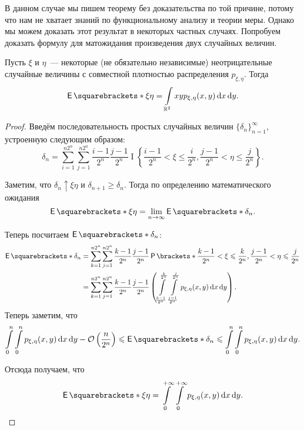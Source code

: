 В данном случае мы пишем теорему без доказательства по той причине, потому что нам не хватает знаний по функциональному анализу и теории меры. Однако мы можем доказать этот результат в некоторых частных случаях. Попробуем доказать формулу для матожидания произведения двух случайных величин.
\begin{theorem}
	Пусть \(\xi\) и \(\eta\)~--- некоторые (не обязательно независимые) неотрицательные случайные величины с совместной плотностью распределения \(p_{\xi, \eta}\). Тогда
	\[
	\E{\xi\eta} = \int\limits_{\R^2} xyp_{\xi,\eta}(x, y)\,\mathrm{d}x\,\mathrm{d}y.
	\]
\end{theorem}
\begin{proof}
	Введём последовательность простых случайных величин \(\{\delta_n\}_{n = 1}^{\infty}\), устроенную следующим образом:
	\[
	\delta_n = \sum_{i = 1}^{n2^{n}}\sum_{j = 1}^{n2^{n}} \frac{i - 1}{2^n}\frac{j - 1}{2^n}\mathop{\mathrm{I}}\left\{\frac{i - 1}{2^n} < \xi \leq \frac{i}{2^n}, \frac{j - 1}{2^n} < \eta \leq \frac{j}{2^n}\right\}.
	\]
	
	Заметим, что \(\delta_n \uparrow \xi\eta\) и \(\delta_{n + 1} \geq \delta_{n}\). Тогда по определению математического ожидания
	\[
	\E{\xi\eta} = \lim\limits_{n \to \infty} \E{\delta_n}.
	\]
	
	Теперь посчитаем \(\E{\delta_n}\):
	\begin{align}
		\E{\delta_n} &= \sum_{k = 1}^{n2^{n}}\sum_{j = 1}^{n2^{n}} \frac{k - 1}{2^n}\frac{j - 1}{2^n}\Pr{\frac{k - 1}{2^n} < \xi \leq \frac{k}{2^n}, \frac{j - 1}{2^n} < \eta \leq \frac{j}{2^n}} \\
		&= \sum_{k = 1}^{n2^{n}}\sum_{j = 1}^{n2^{n}} \frac{k - 1}{2^n}\frac{j - 1}{2^n}\left(\int\limits_{\frac{k - 1}{2^n}}^{\frac{k}{2^n}}\int\limits_{\frac{j - 1}{2^n}}^{\frac{j}{2^n}} p_{\xi,\eta}(x, y)\,\mathrm{d}x\,\mathrm{d}y\right).
	\end{align}
	Теперь заметим, что
	\begin{align}
		\int\limits_{0}^{n}\int\limits_{0}^{n} p_{\xi,\eta}(x, y)\,\mathrm{d}x\,\mathrm{d}y - \mathcal{O}\left(\frac{n}{2^n}\right) \leq \E{\delta_n} \leq \int\limits_{0}^{n}\int\limits_{0}^{n} p_{\xi,\eta}(x, y)\,\mathrm{d}x\,\mathrm{d}y.
	\end{align}
	
	Отсюда получаем, что
	\[
	\E{\xi\eta} = \int\limits_{0}^{+\infty}\int\limits_{0}^{+\infty} p_{\xi,\eta}(x, y)\,\mathrm{d}x\,\mathrm{d}y.
	\]
\end{proof}